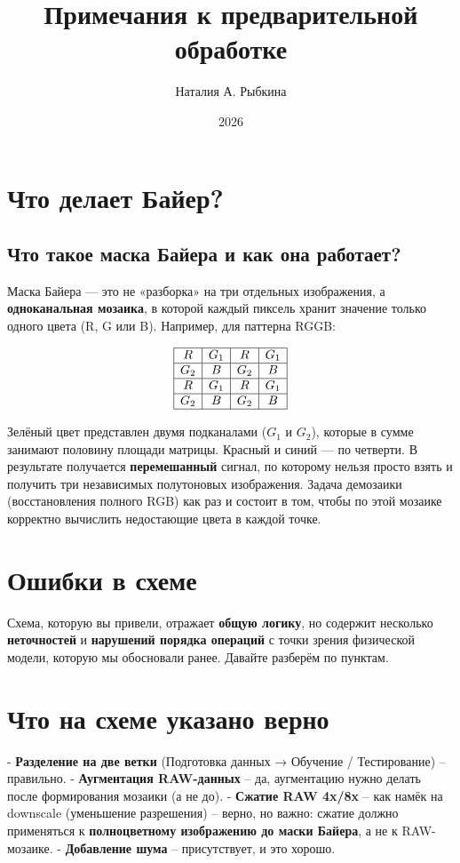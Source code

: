 \documentclass[12pt,a4paper]{article}
\title{Примечания к предварительной обработке}
\author{Наталия А. Рыбкина}
\date{2026}
\begin{document}
\maketitle

\section{Что делает Байер?}

\subsection{Что такое маска Байера и как она работает?}

Маска Байера — это не «разборка» на три отдельных изображения, а \textbf{одноканальная мозаика}, в которой каждый пиксель хранит значение только одного цвета (R, G или B). Например, для паттерна RGGB:

\[
\begin{array}{|c|c|c|c|}
\hline
R & G_1 & R & G_1 \\
\hline
G_2 & B & G_2 & B \\
\hline
R & G_1 & R & G_1 \\
\hline
G_2 & B & G_2 & B \\
\hline
\end{array}
\]

Зелёный цвет представлен двумя подканалами ($G_1$ и $G_2$), которые в сумме занимают половину площади матрицы. Красный и синий — по четверти. В результате получается \textbf{перемешанный} сигнал, по которому нельзя просто взять и получить три независимых полутоновых изображения. Задача демозаики (восстановления полного RGB) как раз и состоит в том, чтобы по этой мозаике корректно вычислить недостающие цвета в каждой точке.

\section{Ошибки в схеме}

Схема, которую вы привели, отражает \textbf{общую логику}, но содержит несколько \textbf{неточностей} и \textbf{нарушений порядка операций} с точки зрения физической модели, которую мы обосновали ранее. Давайте разберём по пунктам.

\section{Что на схеме указано верно}

- \textbf{Разделение на две ветки} (Подготовка данных → Обучение / Тестирование) – правильно.  
- \textbf{Аугментация RAW-данных} – да, аугментацию нужно делать после формирования мозаики (а не до).  
- \textbf{Сжатие RAW 4x/8x} – как намёк на downscale (уменьшение разрешения) – верно, но важно: сжатие должно применяться к \textbf{полноцветному изображению до маски Байера}, а не к RAW-мозаике.  
- \textbf{Добавление шума} – присутствует, и это хорошо.  
\end{document}
